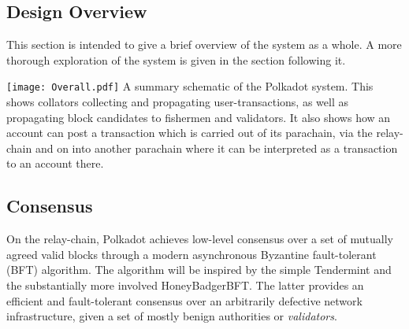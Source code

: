 \documentclass{beamer}
\begin{document}
\begin{frame}

\section{Design Overview}\label{design-overview}

 This section is intended to give a brief overview of the system as a whole. A more thorough exploration of the system is given in the section following it.

\texttt{[image: Overall.pdf]}
A summary schematic of the Polkadot system. This shows collators collecting and propagating user-transactions, as well as propagating block candidates to fishermen and validators. It also shows how an account can post a transaction which is carried out of its parachain, via the relay-chain and on into another parachain where it can be interpreted as a transaction to an account there.

\subsection{Consensus}\label{consensus}

 On the relay-chain, Polkadot achieves low-level consensus over a set of mutually agreed valid blocks through a modern asynchronous Byzantine fault-tolerant (BFT) algorithm. The algorithm will be inspired by the simple Tendermint\cite{kwon2014tendermint} and the substantially more involved HoneyBadgerBFT\cite{miller2016honey}. The latter provides an efficient and fault-tolerant consensus over an arbitrarily defective network infrastructure, given a set of mostly benign authorities or \emph{validators}.


\end{frame}
\end{document}
